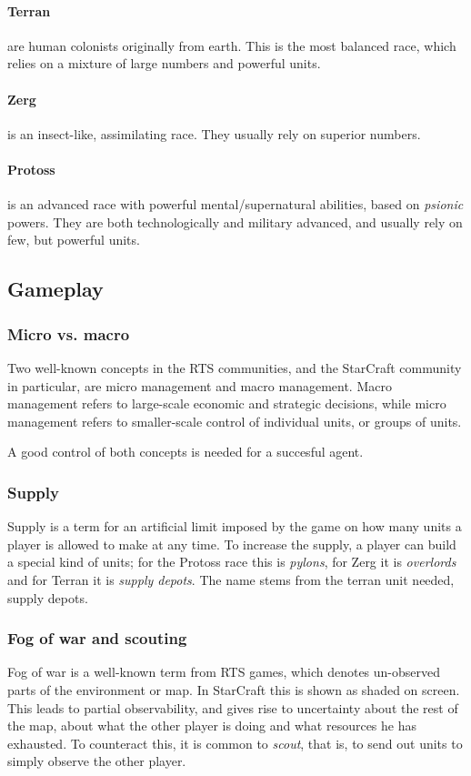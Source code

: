 \paragraph{Terran} are human colonists originally from earth. This is the most balanced race, which relies on a mixture of large numbers and powerful units.
\paragraph{Zerg} is an insect-like, assimilating race. They usually rely on superior numbers.
\paragraph{Protoss} is an advanced race with powerful mental/supernatural abilities, based on {\em psionic} powers. They are both technologically and military advanced, and usually rely on few, but powerful units.

\subsection{Gameplay}
\subsubsection{Micro vs. macro}
Two well-known concepts in the RTS communities, and the StarCraft community in particular, are micro management and macro management. Macro management refers to large-scale economic and strategic decisions, while micro management refers to smaller-scale control of individual units, or groups of units.

A good control of both concepts is needed for a succesful agent.

\subsubsection{Supply}
Supply is a term for an artificial limit imposed by the game on how many units a player is allowed to make at any time. To increase the supply, a player can build a special kind of units; for the Protoss race this is {\em pylons}, for Zerg it is {\em overlords} and for Terran it is {\em supply depots}. The name stems from the terran unit needed, supply depots.

\subsubsection{Fog of war and scouting}
Fog of war is a well-known term from RTS games, which denotes un-observed parts of the environment or map. In StarCraft this is shown as shaded on screen. This leads to partial observability, and gives rise to uncertainty about the rest of the map, about what the other player is doing and what resources he has exhausted. To counteract this, it is common to {\em scout}, that is, to send out units to simply observe the other player.

